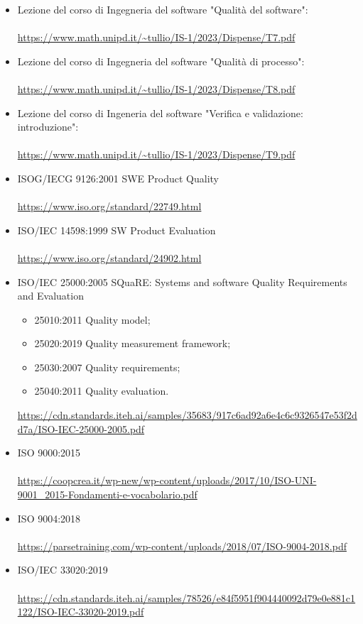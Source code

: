 \documentclass{article}
\begin{document}
\begin{itemize}
    \item Lezione del corso di Ingegneria del software "Qualità del software": \\ \\
    \url{https://www.math.unipd.it/~tullio/IS-1/2023/Dispense/T7.pdf}
    \item Lezione del corso di Ingegneria del software "Qualità di processo": \\ \\
    \url{https://www.math.unipd.it/~tullio/IS-1/2023/Dispense/T8.pdf}
    \item Lezione del corso di Ingeneria del software "Verifica e validazione: introduzione": \\ \\
    \url{https://www.math.unipd.it/~tullio/IS-1/2023/Dispense/T9.pdf}
    \item ISOG/IECG 9126:2001 SWE Product Quality \\ \\
    \url{https://www.iso.org/standard/22749.html}
    \item ISO/IEC 14598:1999 SW Product Evaluation \\ \\
    \url{https://www.iso.org/standard/24902.html}
    \item  ISO/IEC 25000:2005 SQuaRE: Systems and software Quality Requirements and Evaluation 
        \begin{itemize}
        \item 25010:2011 Quality model;
        \item 25020:2019 Quality measurement framework;
        \item 25030:2007 Quality requirements;
        \item 25040:2011 Quality evaluation.
    \end{itemize}
    \url{https://cdn.standards.iteh.ai/samples/35683/917c6ad92a6e4c6c9326547e53f2dd7a/ISO-IEC-25000-2005.pdf}
    \item ISO 9000:2015 \\ \\
    \url{https://coopcrea.it/wp-new/wp-content/uploads/2017/10/ISO-UNI-9001_2015-Fondamenti-e-vocabolario.pdf}
    \item ISO 9004:2018 \\ \\
    \url{https://parsetraining.com/wp-content/uploads/2018/07/ISO-9004-2018.pdf}
    \item ISO/IEC 33020:2019 \\ \\
    \url{https://cdn.standards.iteh.ai/samples/78526/e84f5951f904440092d79e0e881c1122/ISO-IEC-33020-2019.pdf}
\end{itemize}
\end{document}
